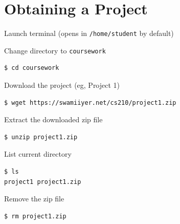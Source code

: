 \documentclass[8pt,a4paper,compress]{beamer}
\begin{document}
\section{Obtaining a Project}
\begin{frame}[fragile]
\pause

Launch terminal (opens in \lstinline{/home/student} by default)

\pause\bigskip

Change directory to \lstinline{coursework}

\begin{tcolorbox}[enhanced,drop shadow southwest,sharp corners,size=fbox,colback=black]
\begin{lstlisting}[style=terminal]
$ cd coursework
\end{lstlisting}
\end{tcolorbox}

\pause\bigskip

Download the project (eg, Project 1)

\begin{tcolorbox}[enhanced,drop shadow southwest,sharp corners,size=fbox,colback=black]
\begin{lstlisting}[style=terminal]
$ wget https://swamiiyer.net/cs210/project1.zip
\end{lstlisting}
\end{tcolorbox}

\pause\bigskip

Extract the downloaded zip file

\begin{tcolorbox}[enhanced,drop shadow southwest,sharp corners,size=fbox,colback=black]
\begin{lstlisting}[style=terminal]
$ unzip project1.zip
\end{lstlisting}
\end{tcolorbox}

\pause\bigskip

List current directory

\begin{tcolorbox}[enhanced,drop shadow southwest,sharp corners,size=fbox,colback=black]
\begin{lstlisting}[style=terminal]
$ ls
project1 project1.zip
\end{lstlisting}
\end{tcolorbox}

\pause\bigskip

Remove the zip file

\begin{tcolorbox}[enhanced,drop shadow southwest,sharp corners,size=fbox,colback=black]
\begin{lstlisting}[style=terminal]
$ rm project1.zip
\end{lstlisting}
\end{tcolorbox}
\end{frame}
\end{document}
